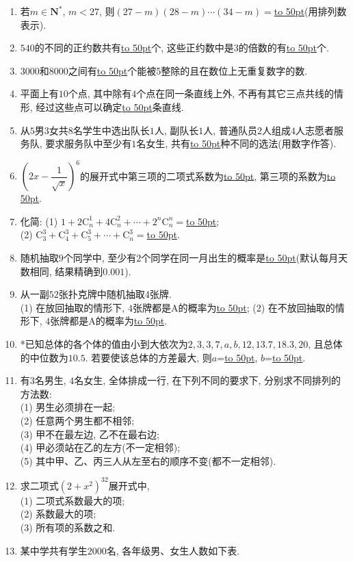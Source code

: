 \documentclass[10pt,a4paper]{article}
\newcommand{\blank}[1]{\underline{\hbox to #1pt{}}}
\begin{document}
\begin{enumerate}[1.]
\item 若$m\in \mathbf{N}^*$, $m<27$, 则$(27-m)(28-m)\cdots (34-m)=$\blank{50}(用排列数表示).
\item $540$的不同的正约数共有\blank{50}个, 这些正约数中是$3$的倍数的有\blank{50}个.
\item $3000$和$8000$之间有\blank{50}个能被5整除的且在数位上无重复数字的数.
\item 平面上有$10$个点, 其中除有$4$个点在同一条直线上外, 不再有其它三点共线的情形, 经过这些点可以确定\blank{50}条直线.
\item 从$5$男$3$女共$8$名学生中选出队长$1$人, 副队长$1$人, 普通队员$2$人组成$4$人志愿者服务队, 要求服务队中至少有$1$名女生, 共有\blank{50}种不同的选法(用数字作答).
\item $(2x-\dfrac 1{\sqrt x})^6$的展开式中第三项的二项式系数为\blank{50}, 第三项的系数为\blank{50}.
\item 化简: (1) $1+2\mathrm{C}_n^1+4\mathrm{C}_n^2+\cdots+2^n\mathrm{C}_n^n=$\blank{50};\\
(2) $\mathrm{C}_3^3+\mathrm{C}_4^3+\mathrm{C}_5^3+\cdots+\mathrm{C}_n^3=$\blank{50}.
\item 随机抽取$9$个同学中, 至少有$2$个同学在同一月出生的概率是\blank{50}(默认每月天数相同, 结果精确到$0.001$).
\item 从一副$52$张扑克牌中随机抽取$4$张牌.\\
(1) 在放回抽取的情形下, $4$张牌都是A的概率为\blank{50};
(2) 在不放回抽取的情形下, $4$张牌都是A的概率为\blank{50}.
\item *已知总体的各个体的值由小到大依次为$2,3,3,7,a,b,12, 13.7,18.3,20$, 且总体的中位数为$10.5$. 若要使该总体的方差最大, 则$a$=\blank{50}, $b$=\blank{50}.
\item 有$3$名男生, $4$名女生, 全体排成一行, 在下列不同的要求下, 分别求不同排列的方法数:\\
(1) 男生必须排在一起;\\
(2) 任意两个男生都不相邻;\\
(3) 甲不在最左边, 乙不在最右边;\\
(4) 甲必须站在乙的左方(不一定相邻);\\
(5) 其中甲、乙、丙三人从左至右的顺序不变(都不一定相邻).
\item 求二项式$(2+x^2)^{32}$展开式中,\\
(1) 二项式系数最大的项;\\
(2) 系数最大的项;\\
(3) 所有项的系数之和.
\item 某中学共有学生$2000$名, 各年级男、女生人数如下表.
\begin{center}

\end{center}
\end{enumerate}
\end{document}
